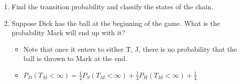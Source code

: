 \documentclass[12pt]{article}
\begin{document}
\begin{enumerate}[label=(\alph*)]
    \item Find the transition probability and classify the states of the chain.
    
\begin{minipage}[t]{0.4\textwidth}
          \centering{}
        \end{minipage}\hfill
        \begin{minipage}[t]{0.4\textwidth}
          \centering{}
        \end{minipage}


    \item Suppose Dick has the ball at the beginning of the game. What is the probability Mark will end up with it?
    \begin{itemize}
        \item Note that once it enters to either T, J, there is no probability that the ball is thrown to Mark at the end.
    
        \item $P_D(T_M<\infty) = \frac{1}{4}P_S(T_M<\infty) + \frac{1}{4}P_H(T_M<\infty) + \frac{1}{4}$
        

\end{itemize}
\end{enumerate}
\end{document}

